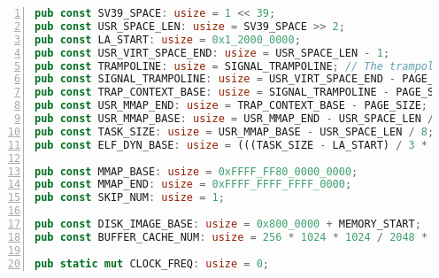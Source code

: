 \documentclass{article}
\begin{document}
\begin{center}
\begin{lstlisting}[language=RUST,numbers=left]
pub const SV39_SPACE: usize = 1 << 39;
pub const USR_SPACE_LEN: usize = SV39_SPACE >> 2;
pub const LA_START: usize = 0x1_2000_0000;
pub const USR_VIRT_SPACE_END: usize = USR_SPACE_LEN - 1;
pub const TRAMPOLINE: usize = SIGNAL_TRAMPOLINE; // The trampoline is NOT mapped in LA.
pub const SIGNAL_TRAMPOLINE: usize = USR_VIRT_SPACE_END - PAGE_SIZE + 1;
pub const TRAP_CONTEXT_BASE: usize = SIGNAL_TRAMPOLINE - PAGE_SIZE;
pub const USR_MMAP_END: usize = TRAP_CONTEXT_BASE - PAGE_SIZE;
pub const USR_MMAP_BASE: usize = USR_MMAP_END - USR_SPACE_LEN / 8 + 0x3000;
pub const TASK_SIZE: usize = USR_MMAP_BASE - USR_SPACE_LEN / 8;
pub const ELF_DYN_BASE: usize = (((TASK_SIZE - LA_START) / 3 * 2) | LA_START) & (!(PAGE_SIZE - 1));

pub const MMAP_BASE: usize = 0xFFFF_FF80_0000_0000;
pub const MMAP_END: usize = 0xFFFF_FFFF_FFFF_0000;
pub const SKIP_NUM: usize = 1;

pub const DISK_IMAGE_BASE: usize = 0x800_0000 + MEMORY_START;
pub const BUFFER_CACHE_NUM: usize = 256 * 1024 * 1024 / 2048 * 4 / 2048;

pub static mut CLOCK_FREQ: usize = 0;
    \end{lstlisting}
\end{center}
\end{document}
